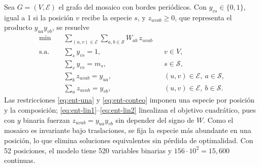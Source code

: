 Sea $G=(V,\mathcal{E})$ el grafo del mosaico con bordes periódicos. Con $y_{vs}\in\{0,1\}$, igual a 1 si la posición $v$ recibe la especie $s$, y $z_{uvab}\geq0$, que representa el producto $y_{ua}y_{vb}$, se resuelve
\begin{align}
\min\quad & \sum_{(u,v)\in\mathcal{E}}\sum_{a,b\in\mathcal{S}}W_{ab}\,z_{uvab} \label{eq:ent-obj}\\
\text{s.a.}\quad & \textstyle\sum_{s}y_{vs}=1, && v\in V, \label{eq:ent-una}\\
& \textstyle\sum_{v}y_{vs}=m_s, && s\in\mathcal{S}, \label{eq:ent-conteo}\\
& \textstyle\sum_{b}z_{uvab}=y_{ua}, && (u,v)\in\mathcal{E},\ a\in\mathcal{S}, \label{eq:ent-lin1}\\
& \textstyle\sum_{a}z_{uvab}=y_{vb}, && (u,v)\in\mathcal{E},\ b\in\mathcal{S}. \label{eq:ent-lin2}
\end{align}
Las restricciones \eqref{eq:ent-una} y \eqref{eq:ent-conteo} imponen una especie por posición y la composición; \eqref{eq:ent-lin1}--\eqref{eq:ent-lin2} linealizan el objetivo cuadrático, pues con $y$ binaria fuerzan $z_{uvab}=y_{ua}y_{vb}$ sin depender del signo de $W$. Como el mosaico es invariante bajo traslaciones, se fija la especie más abundante en una posición, lo que elimina soluciones equivalentes sin pérdida de optimalidad. Con 52 posiciones, el modelo tiene 520 variables binarias y $156\cdot10^{2}=15{,}600$ continuas.
